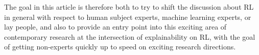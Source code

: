 \documentclass[twoside,11pt]{article}
\begin{document}
The goal in this article is therefore both to try to shift the discussion about RL in general with respect to human subject experts, machine learning experts, or lay people, and also to provide an entry point into this exciting area of contemporary research at the intersection of explainability on RL, with the goal of getting non-experts quickly up to speed on exciting research directions.








\end{document}

